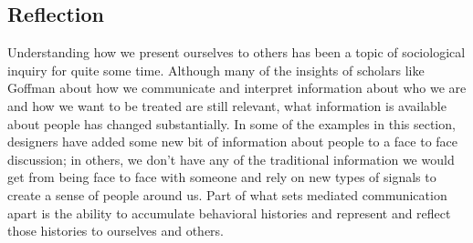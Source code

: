 \documentclass{tufte-handout}
\begin{document}






% 

%



%


\subsection{Reflection}

Understanding how we present ourselves to others has been a topic of sociological inquiry for quite some time. Although many of the insights of scholars like Goffman \citet{goffman_presentation_of_self} \citet{someone_else} about how we communicate and interpret information about who we are and how we want to be treated are still relevant, what information is available about people has changed substantially. In some of the examples in this section, designers have added some new bit of information about people to a face to face discussion; in others, we don't have any of the traditional information we would get from being face to face with someone and rely on new types of signals to create a sense of people around us. Part of what sets mediated communication apart is the ability to accumulate behavioral histories and represent and reflect those histories to ourselves and others.
\end{document}
